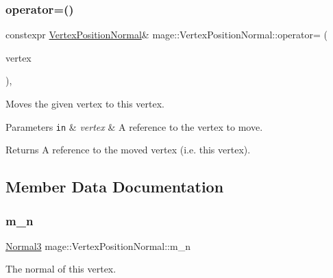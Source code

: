\subsubsection{\texorpdfstring{operator=()}{operator=()}\hspace{0.1cm}{\footnotesize\ttfamily [2/2]}}
{\footnotesize\ttfamily constexpr \hyperlink{structmage_1_1_vertex_position_normal}{Vertex\+Position\+Normal}\& mage\+::\+Vertex\+Position\+Normal\+::operator= (\begin{DoxyParamCaption}\item[{\hyperlink{structmage_1_1_vertex_position_normal}{Vertex\+Position\+Normal} \&\&}]{vertex }\end{DoxyParamCaption})\hspace{0.3cm}{\ttfamily [default]}, {\ttfamily [noexcept]}}

Moves the given vertex to this vertex.


\begin{DoxyParams}[1]{Parameters}
\mbox{\tt in}  & {\em vertex} & A reference to the vertex to move. \\
\hline
\end{DoxyParams}
\begin{DoxyReturn}{Returns}
A reference to the moved vertex (i.\+e. this vertex). 
\end{DoxyReturn}


\subsection{Member Data Documentation}
\hypertarget{structmage_1_1_vertex_position_normal_a5b687f150537e625dcca810d3fded3e6}{}\label{structmage_1_1_vertex_position_normal_a5b687f150537e625dcca810d3fded3e6} 
\subsubsection{\texorpdfstring{m\+\_\+n}{m\_n}}
{\footnotesize\ttfamily \hyperlink{structmage_1_1_normal3}{Normal3} mage\+::\+Vertex\+Position\+Normal\+::m\+\_\+n}

The normal of this vertex. \hypertarget{structmage_1_1_vertex_position_normal_abe9d881b1ebe279ccfb70c94a441e162}{}\label{structmage_1_1_vertex_position_normal_abe9d881b1ebe279ccfb70c94a441e162} 
